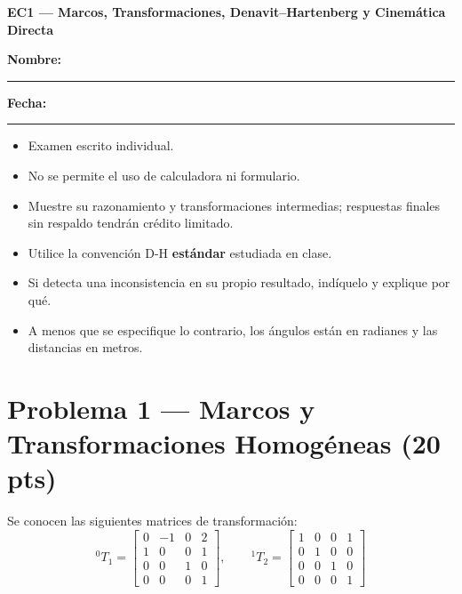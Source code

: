 \documentclass[11pt, a4paper]{article}
\begin{document}
\begin{center}
    \Large\textbf{\textcolor{ucbblue}{EC1 — Marcos, Transformaciones, Denavit–Hartenberg y Cinemática Directa}}\\[0.2cm]
\end{center}

\textbf{Nombre:} \rule{8cm}{0.15mm} \hfill \textbf{Fecha:} \rule{4cm}{0.15mm}

\vspace{0.4cm}
\begin{tcolorbox}[colback=gray!5, colframe=gray!50, title=\textbf{Condiciones de la Evaluación}]
    \begin{itemize}
        \item Examen escrito individual.
        \item No se permite el uso de calculadora ni formulario.
        \item Muestre su razonamiento y transformaciones intermedias; respuestas finales sin respaldo tendrán crédito limitado.
        \item Utilice la convención D-H \textbf{estándar} estudiada en clase.
        \item Si detecta una inconsistencia en su propio resultado, indíquelo y explique por qué.
        \item A menos que se especifique lo contrario, los ángulos están en radianes y las distancias en metros.
    \end{itemize}
\end{tcolorbox}

\section*{Problema 1 — Marcos y Transformaciones Homogéneas (20 pts)}
Se conocen las siguientes matrices de transformación:
\begin{equation*}
    {}^{0}T_1 = \begin{bmatrix} 0 & -1 & 0 & 2 \\ 1 & 0 & 0 & 1 \\ 0 & 0 & 1 & 0 \\ 0 & 0 & 0 & 1 \end{bmatrix}, \qquad
    {}^{1}T_2 = \begin{bmatrix} 1 & 0 & 0 & 1 \\ 0 & 1 & 0 & 0 \\ 0 & 0 & 1 & 0 \\ 0 & 0 & 0 & 1 \end{bmatrix}
\end{equation*}
\end{document}
